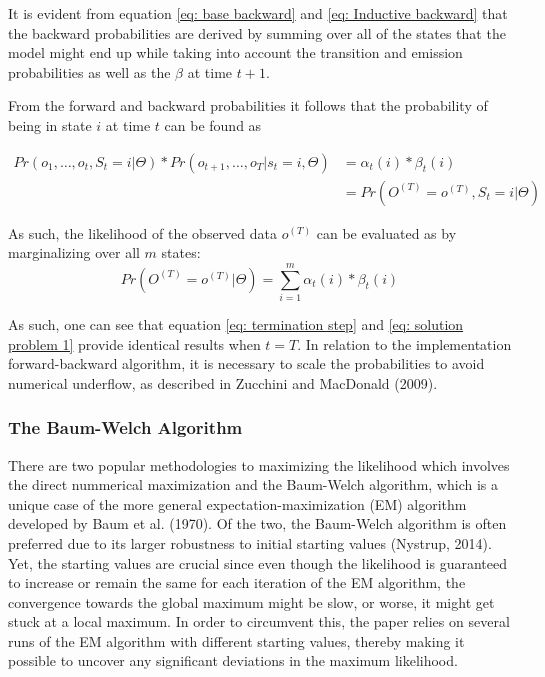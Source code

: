 It is evident from equation \ref{eq: base backward} and \ref{eq: Inductive backward} that the backward probabilities are derived by summing over all of the states that the model might end up while taking into account the transition and emission probabilities as well as the $\beta$ at time $t+1$.

From the forward and backward probabilities it follows that the probability of being in state $i$ at time $t$ can be found as

\begin{align}
    Pr(o_1,\ldots,o_t, S_t = i | \Theta) * 
    Pr(o_{t+1},\ldots,o_T | s_t = i, \Theta)
     &=\alpha_t(i) * \beta_t(i) \\
     &= Pr(O^{(T)} = o^{(T)}, S_t = i |\Theta)
\end{align}

As such, the likelihood of the observed data $o^{(T)}$ can be evaluated as by marginalizing over all $m$ states:
\begin{equation}
    Pr(O^{(T)} = o^{(T)} | \Theta) = \sum_{i=1}^m \alpha_t(i) * \beta_t(i)
    \label{eq: solution problem 1}
\end{equation}

As such, one can see that equation \ref{eq: termination step} and \ref{eq: solution problem 1} provide identical results when $t=T$. In relation to the implementation forward-backward algorithm, it is necessary to scale the probabilities to avoid numerical
underflow, as described in Zucchini and MacDonald (2009). 

\subsubsection{The Baum-Welch Algorithm}
There are two popular methodologies to maximizing the likelihood which involves the direct nummerical maximization and the Baum-Welch algorithm, which is a unique case of the more general expectation-maximization (EM) algorithm developed by Baum et al. (1970). Of the two, the Baum-Welch algorithm is often preferred due to its larger robustness to initial starting values (Nystrup, 2014). Yet, the starting values are crucial since even though the likelihood is guaranteed to increase or remain the same for each iteration of the EM algorithm, the convergence towards the global maximum might be slow, or worse, it might get stuck at a local maximum. In order to circumvent this, the paper relies on several runs of the EM algorithm with different starting values, thereby making it possible to uncover any significant deviations in the maximum likelihood. 

